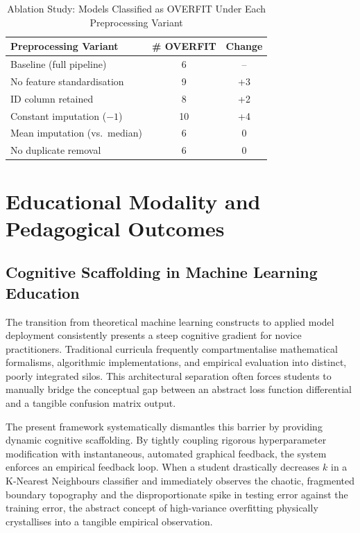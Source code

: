 \documentclass[conference]{IEEEtran}
\begin{document}
\begin{table}[t]
    \caption{Ablation Study: Models Classified as OVERFIT Under Each Preprocessing Variant}
    \label{tab:ablation}
    \centering
    \small
    \renewcommand{\arraystretch}{1.3}
    \begin{tabular}{|>{\raggedright\arraybackslash}p{1.6in}|c|c|}
    \hline
    \textbf{Preprocessing Variant} & \textbf{\# OVERFIT} & \textbf{Change} \\
    \hline
    Baseline (full pipeline)        & 6  & -- \\
    \hline
    No feature standardisation      & 9  & +3 \\
    \hline
    ID column retained              & 8  & +2 \\
    \hline
    Constant imputation ($-1$)      & 10 & +4 \\
    \hline
    Mean imputation (vs.\ median)   & 6  & 0 \\
    \hline
    No duplicate removal            & 6  & 0 \\
    \hline
    \end{tabular}
\end{table}

\section{Educational Modality and Pedagogical Outcomes}

\subsection{Cognitive Scaffolding in Machine Learning Education}

The transition from theoretical machine learning constructs to applied model deployment consistently presents a steep cognitive gradient for novice practitioners. Traditional curricula frequently compartmentalise mathematical formalisms, algorithmic implementations, and empirical evaluation into distinct, poorly integrated silos. This architectural separation often forces students to manually bridge the conceptual gap between an abstract loss function differential and a tangible confusion matrix output.

The present framework systematically dismantles this barrier by providing dynamic cognitive scaffolding. By tightly coupling rigorous hyperparameter modification with instantaneous, automated graphical feedback, the system enforces an empirical feedback loop. When a student drastically decreases $k$ in a K-Nearest Neighbours classifier and immediately observes the chaotic, fragmented boundary topography and the disproportionate spike in testing error against the training error, the abstract concept of high-variance overfitting physically crystallises into a tangible empirical observation.
\end{document}
